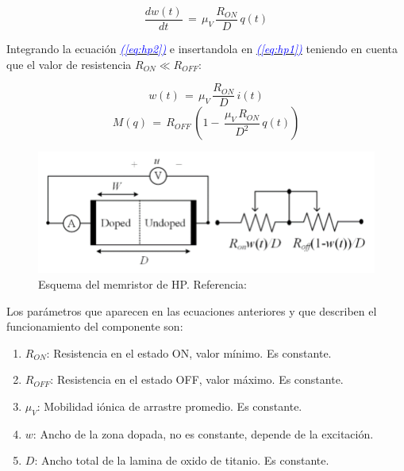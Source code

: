 \documentclass[12pt,a4paper]{report} %
\newcommand{\eref}[1]{\hyperref[#1]{\textcolor{blue}{\textit{(\ref*{#1})}}}}
\begin{document}
	\begin{equation}
		\frac{dw(t)}{dt}\,=\,\mu_V\,\frac{R_{ON}}{D}\,q(t)
		\label{eq:hp2}
	\end{equation}\smallskip
	
	Integrando la ecuación \eref{eq:hp2} e insertandola en \eref{eq:hp1} teniendo en cuenta que el valor de resistencia  $R_{ON} \ll R_{OFF}$: 
	
	\begin{equation}
		w(t)\,=\,\mu_V\,\frac{R_{ON}}{D}\,i(t)
		\label{eq:hp3}
	\end{equation}\smallskip
	\begin{equation}
		M(q)\,=\,R_{OFF}\,\left(1-\,\frac{\mu_V\,R_{ON}}{D^2}\,q(t)\right)
		\label{eq:hp4}
	\end{equation}\smallskip
	
	\begin{figure}[h]
		\centering
		\includegraphics[width=1\textwidth]{schmem.png}
		\caption{Esquema del memristor de HP. Referencia: \cite{2021}}
		\label{fig:2021}
	\end{figure}\smallskip
	
	Los parámetros que aparecen en las ecuaciones anteriores y que describen el funcionamiento del componente son:
	
	\begin{enumerate}
		\item $R_{ON}$: Resistencia en el estado ON, valor mínimo. Es constante.
		\item $R_{OFF}$: Resistencia en el estado OFF, valor máximo. Es constante.
		\item $\mu_V$: Mobilidad iónica de arrastre promedio. Es constante.
		\item $w$: Ancho de la zona dopada, no es constante, depende de la excitación.
		\item $D$: Ancho total de la lamina de oxido de titanio. Es constante.
	\end{enumerate}
	\newpage
	
\end{document}
